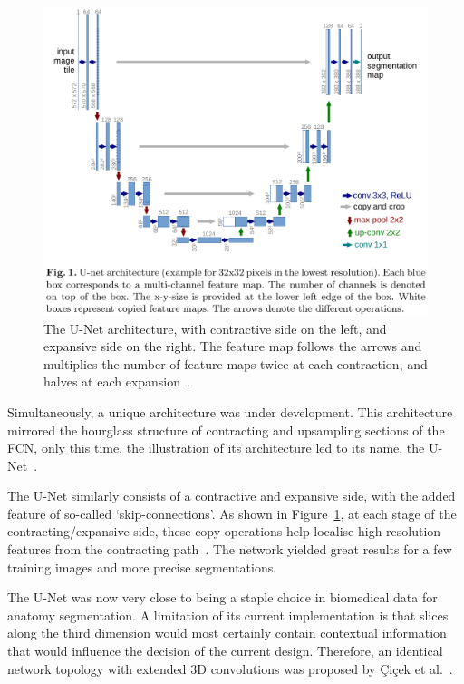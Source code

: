 \documentclass[11pt,twoside]{report}
\begin{document}
\begin{figure}[H]
  \centering
  \includegraphics[width=.8\linewidth, trim=0 200px 0 0, clip]{../figures/u-net.png}
  \caption{The U-Net architecture, with contractive side on the left, and expansive side on the right. The feature map follows the arrows and multiplies the number of feature maps twice at each contraction, and halves at each expansion~\cite{U-Net}.}\label{fig:unet}
\end{figure}


Simultaneously, a unique architecture was under development. This architecture mirrored the hourglass structure of contracting and upsampling sections of the FCN, only this time, the illustration of its architecture led to its name, the U-Net~\cite{U-Net}.

The U-Net similarly consists of a contractive and expansive side, with the added feature of so-called `skip-connections'. As shown in Figure~\ref{fig:unet}, at each stage of the contracting/expansive side, these copy operations help localise high-resolution features from the contracting path~\cite{U-Net}. The network yielded great results for a few training images and more precise segmentations.


The U-Net was now very close to being a staple choice in biomedical data for anatomy segmentation. A limitation of its current implementation is that slices along the third dimension would most certainly contain contextual information that would influence the decision of the current design. Therefore, an identical network topology with extended 3D convolutions was proposed by \c{C}i{\c{c}}ek et al.~\cite{DBLP:journals/corr/CicekALBR16}.
\end{document}
